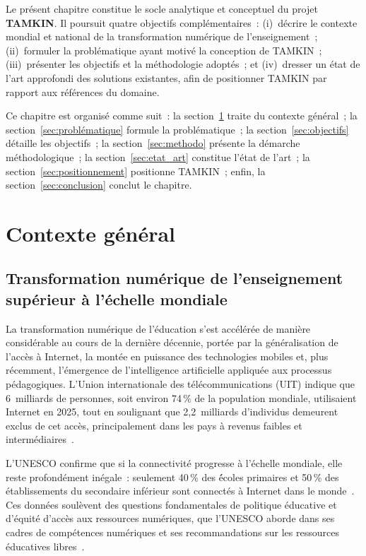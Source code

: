 \documentclass[12pt,a4paper,oneside]{report}
\begin{document}
Le pr\'esent chapitre constitue le socle analytique et conceptuel du projet \textbf{TAMKIN}. Il poursuit quatre objectifs compl\'ementaires~: (i)~d\'ecrire le contexte mondial et national de la transformation num\'erique de l'enseignement~; (ii)~formuler la probl\'ematique ayant motiv\'e la conception de TAMKIN~; (iii)~pr\'esenter les objectifs et la m\'ethodologie adopt\'es~; et (iv)~dresser un \'etat de l'art approfondi des solutions existantes, afin de positionner TAMKIN par rapport aux r\'ef\'erences du domaine.

Ce chapitre est organis\'e comme suit~: la section~\ref{sec:contexte} traite du contexte g\'en\'eral~; la section~\ref{sec:problématique} formule la probl\'ematique~; la section~\ref{sec:objectifs} d\'etaille les objectifs~; la section~\ref{sec:methodo} pr\'esente la d\'emarche m\'ethodologique~; la section~\ref{sec:etat_art} constitue l'\'etat de l'art~; la section~\ref{sec:positionnement} positionne TAMKIN~; enfin, la section~\ref{sec:conclusion} conclut le chapitre.

\section{Contexte g\'en\'eral}
\label{sec:contexte}

\subsection{Transformation num\'erique de l'enseignement sup\'erieur \`a l'\'echelle mondiale}

La transformation num\'erique de l'\'education s'est acc\'el\'er\'ee de mani\`ere consid\'erable au cours de la derni\`ere d\'ecennie, port\'ee par la g\'en\'eralisation de l'acc\`es \`a Internet, la mont\'ee en puissance des technologies mobiles et, plus r\'ecemment, l'\'emergence de l'intelligence artificielle appliqu\'ee aux processus p\'edagogiques. L'Union internationale des t\'el\'ecommunications (UIT) indique que 6~milliards de personnes, soit environ 74\,\% de la population mondiale, utilisaient Internet en 2025, tout en soulignant que 2,2~milliards d'individus demeurent exclus de cet acc\`es, principalement dans les pays \`a revenus faibles et interm\'ediaires~\cite{itu_facts_2025}.

L'UNESCO confirme que si la connectivit\'e progresse \`a l'\'echelle mondiale, elle reste profond\'ement in\'egale~: seulement 40\,\% des \'écoles primaires et 50\,\% des \'etablissements du secondaire inf\'erieur sont connect\'es \`a Internet dans le monde~\cite{unesco_gem_2023}. Ces donn\'ees soul\`event des questions fondamentales de politique \'educative et d'\'equit\'e d'acc\`es aux ressources num\'eriques, que l'UNESCO aborde dans ses cadres de comp\'etences num\'eriques et ses recommandations sur les ressources \'educatives libres~\cite{unesco_oer_2019,unesco_digital_2026}.
\end{document}
